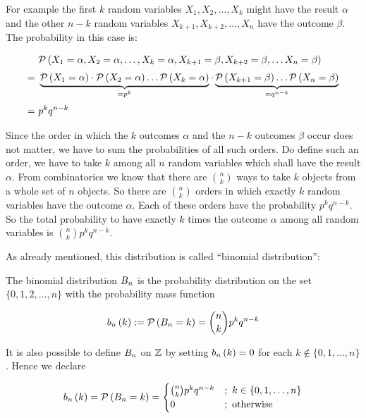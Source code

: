 For example the first $k$ random variables $X_1,X_2,\ldots,X_k$ might have the result $\alpha$ and the other $n-k$ random variables $X_{k+1},X_{k+2},\ldots,X_n$ have the outcome $\beta$. The probability in this case is:

\begin{align}
  & \P{X_1=\alpha, X_2=\alpha, \ldots, X_k=\alpha,X_{k+1}=\beta, X_{k+2}=\beta, \ldots X_n =\beta} \nl
  =\ & \underbrace{\P{X_1=\alpha} \cdot \P{ X_2=\alpha} \ldots \P{X_k=\alpha}}_{=p^k} \cdot \underbrace{\P{X_{k+1}=\beta} \ldots \P{X_n =\beta}}_{= q^{n-k}} \nl
  =\ & p^kq^{n-k}
\end{align}

Since the order in which the $k$ outcomes $\alpha$ and the $n-k$ outcomes $\beta$ occur does not matter, we have to sum the probabilities of all such orders. Do define such an order, we have to take $k$ among all $n$ random variables which shall have the result $\alpha$. From combinatorics we know that there are $\binom nk$ ways to take $k$ objects from a whole set of $n$ objects. So there are $\binom nk$ orders in which exactly $k$ random variables have the outcome $\alpha$. Each of these orders have the probability $p^kq^{n-k}$. So the total probability to have exactly $k$ times the outcome $\alpha$ among all random variables is $\binom nk p^kq^{n-k}$.

As already mentioned, this distribution is called ``binomial distribution'':

\begin{definition}
  The binomial distribution $B_{n}$ is the probability distribution on the set $\{0,1,2,\ldots,n\}$ with the probability mass function

  \begin{align}
      b_{n}\left({k}\right):=\mathcal P\left({B_{n}=k}\right) = \binom nk p^k q^{n-k}
  \end{align}
\end{definition}

It is also possible to define $B_{n}$ on $\mathbb Z$ by setting $b_{n}\left({k}\right)=0$ for each $k\notin \{0,1,\ldots,n\}$. Hence we declare

\begin{align}
\b[n]{k} = \P{\Bs[n] = k} = \begin{cases} \binom nk p^k q^{n-k} & ;\ k \in \{0,1,\ldots,n\} \\ 0 & ;\  \text{otherwise} \end{cases}
\end{align}


